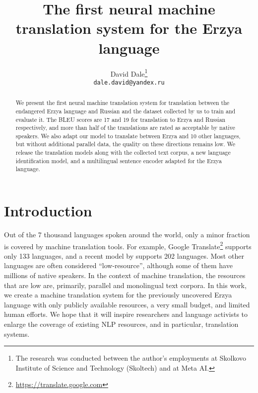 \documentclass[11pt]{article}
\title{The first neural machine translation system for the Erzya language}
\author{David Dale\thanks{\hspace{0.05cm} The research was conducted between the author's employments at Skolkovo Institute of Science and Technology (Skoltech) and at Meta AI.} \\
 \texttt{dale.david@yandex.ru}\\}
\begin{document}
\maketitle
\begin{abstract}
We present the first neural machine translation system for translation between the endangered Erzya language and Russian and the dataset collected by us to train and evaluate it. The BLEU scores are 17 and 19 for translation to Erzya and Russian respectively, and more than half of the translations are rated as acceptable by native speakers. 
We also adapt our model to translate between Erzya and 10 other languages, 
but without additional parallel data, the quality on these directions remains low. 
We release the translation models along with the collected text corpus, a new language identification model, and a multilingual sentence encoder adapted for the Erzya language.
\end{abstract}


\section{Introduction}
Out of the 7 thousand languages spoken around the world, only a minor fraction is covered by machine translation tools. For example, Google Translate\footnote{\url{https://translate.google.com}} supports only 133 languages, and a recent model by \citet{nllb2022} supports 202 languages. Most other languages are often considered ``low-resource'', although some of them have millions of native speakers. In the context of machine translation, the resources that are low are, primarily, parallel and monolingual text corpora. In this work, we create a machine translation system for the previously uncovered Erzya language with only publicly available resources, a very small budget, and limited human efforts. We hope that it will inspire researchers and language activists to enlarge the coverage of existing NLP resources, and in particular, translation systems. 
\end{document}
